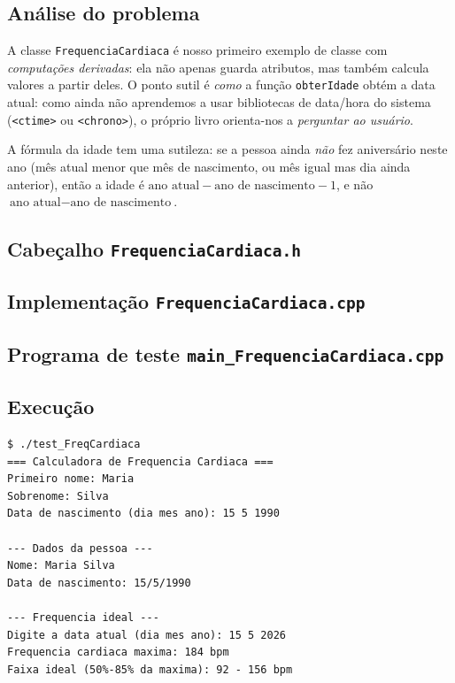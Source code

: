\documentclass[11pt,a4paper]{article}
\begin{document}
\subsection*{An\'alise do problema}

A classe \texttt{FrequenciaCardiaca} \'e nosso primeiro exemplo de classe com \emph{computa\c{c}\~oes derivadas}: ela n\~ao apenas guarda atributos, mas tamb\'em calcula valores a partir deles. O ponto sutil \'e \emph{como} a fun\c{c}\~ao \texttt{obterIdade} obt\'em a data atual: como ainda n\~ao aprendemos a usar bibliotecas de data/hora do sistema (\texttt{<ctime>} ou \texttt{<chrono>}), o pr\'oprio livro orienta-nos a \emph{perguntar ao usu\'ario}.

A f\'ormula da idade tem uma sutileza: se a pessoa ainda \emph{n\~ao} fez anivers\'ario neste ano (m\^es atual menor que m\^es de nascimento, ou m\^es igual mas dia ainda anterior), ent\~ao a idade \'e $\text{ano atual} - \text{ano de nascimento} - 1$, e n\~ao $\text{ano atual} - \text{ano de nascimento}$.

\subsection*{Cabe\c{c}alho \texttt{FrequenciaCardiaca.h}}



\subsection*{Implementa\c{c}\~ao \texttt{FrequenciaCardiaca.cpp}}



\subsection*{Programa de teste \texttt{main\_FrequenciaCardiaca.cpp}}



\subsection*{Execu\c{c}\~ao}

\begin{saidabox}
\begin{lstlisting}[style=terminal]
$ ./test_FreqCardiaca
=== Calculadora de Frequencia Cardiaca ===
Primeiro nome: Maria
Sobrenome: Silva
Data de nascimento (dia mes ano): 15 5 1990

--- Dados da pessoa ---
Nome: Maria Silva
Data de nascimento: 15/5/1990

--- Frequencia ideal ---
Digite a data atual (dia mes ano): 15 5 2026
Frequencia cardiaca maxima: 184 bpm
Faixa ideal (50%-85% da maxima): 92 - 156 bpm
\end{lstlisting}
\end{saidabox}
\end{document}

